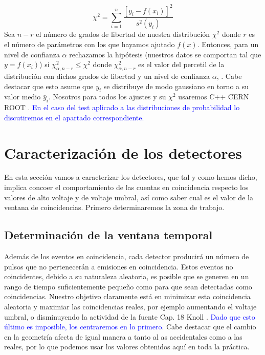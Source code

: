 \documentclass[11pt]{article}
\newcommand{\ccorchetes}[1]{\left[ #1  \right]}
\begin{document}
\begin{equation}
	\chi^2 = \sum_{i=1}^n \frac{\ccorchetes{y_i-f(x_i)}^2}{s^2(y_i)}
\end{equation}
Sea $n-r$ el número de grados de libertad de nuestra distribución $\chi^2$ donde $r$ es el número de parámetros con los que hayamos ajutado $f(x)$. Entonces, para un nivel de confianza $\alpha$ rechazamos la hipótesis (nuestros datos se comportan tal que $y=f(x_i)$) si $\chi^2_{\alpha,n-r} \leq \chi^2$ donde $\chi^2_{\alpha,n-r}$ es el valor del percetil de la distribución con dichos grados de libertad y un nivel de confianza $\alpha$, \cite{Estadistica}. Cabe destacar que esto asume que $y_i$ se distribuye de modo gaussiano en torno a su valor medio $\bar{y}_i$. Nosotros para todos los ajustes y su $\chi^2$ usaremos C++ CERN ROOT \cite{Root}. \textcolor{blue}{En el caso del test aplicado a las distribuciones de probabilidad lo discutiremos en el apartado correspondiente.}


\section{Caracterización de los detectores}

En esta sección vamos a caracterizar los detectores, que tal y como hemos dicho, implica concoer el comportamiento de las cuentas en coincidencia respecto los valores de alto voltaje y de voltaje umbral, así como saber cual es el valor de la ventana de coincidencias. Primero determinaremos la zona de trabajo.



\subsection{Determinación de la ventana temporal} \label{Subsec:ventana_temporal}

Además de los eventos en coincidencia, cada detector producirá un número de pulsos que no pertenecerán a emisiones en coincidencia. Estos eventos no coincidentes, debido a su naturaleza aleatoria, es posible que se generen en un rango de tiempo suficientemente pequeño como para que sean detectadas como coincidencias. Nuestro objetivo claramente está en minimizar esta coincidencia aleatoria y maximiar las coincidencias reales, por ejemplo aumentando el voltaje umbral, o disminuyendo la actividad de la fuente Cap. 18 Knoll \cite{Knoll:1300754}. \textcolor{blue}{Dado que esto último es imposible, los centraremos en lo primero}. Cabe destacar que el cambio en la geometría afecta de igual manera a tanto al as accidentales como a las reales, por lo que podemos usar los valores obtenidos aquí en toda la práctica.
\end{document}
